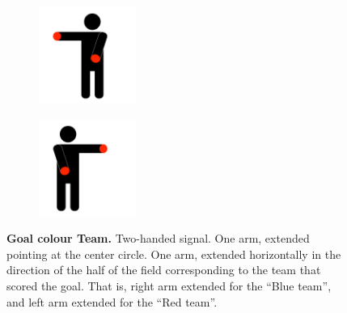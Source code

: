         \begin{figure}[ht!]
            \centering
            \begin{subfigure}{.33\textwidth}
                \includegraphics[height=120px]{figs/referee-signals/goal.png}
            \end{subfigure}
            \begin{subfigure}{.33\textwidth}
                \includegraphics[height=120px]{figs/referee-signals/goal-flipped.png}
            \end{subfigure}
            \caption{\textbf{Goal \textlangle{}colour\textrangle{}  Team.}
            Two-handed signal. One arm, extended pointing at the center circle. One arm, extended horizontally in the direction of the half of the field corresponding to the team that scored the goal. That is, right arm extended for the ``Blue team'', and left arm extended for the ``Red team''.}
        \end{figure}

